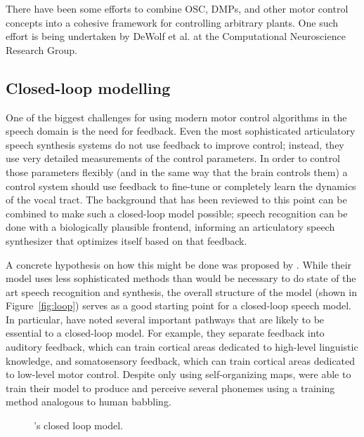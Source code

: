 \documentclass{article}
\begin{document}
There have been some efforts
to combine OSC, DMPs, and other motor control concepts
into a cohesive framework
for controlling arbitrary plants.
One such effort is being undertaken
by DeWolf et al. at the
Computational Neuroscience Research Group.

\subsection{Closed-loop modelling}
\label{subsec:closed-loop}

One of the biggest challenges
for using modern motor control algorithms
in the speech domain
is the need for feedback.
Even the most sophisticated
articulatory speech synthesis systems
do not use feedback to improve control;
instead, they use very detailed measurements
of the control parameters.
In order to control those parameters flexibly
(and in the same way that the brain controls them)
a control system should use feedback
to fine-tune or completely learn
the dynamics of the vocal tract.
The background that has been reviewed
to this point can be combined
to make such a closed-loop model possible;
speech recognition can be done
with a biologically plausible frontend,
informing an articulatory speech synthesizer
that optimizes itself based on that feedback.

A concrete hypothesis on how
this might be done was proposed by
\citet{kroger2009}.
While their model uses less sophisticated
methods than would be necessary
to do state of the art
speech recognition and synthesis,
the overall structure of the model
(shown in Figure~\ref{fig:loop})
serves as a good starting point
for a closed-loop speech model.
In particular, \citeauthor{kroger2009} have
noted several important pathways
that are likely to be essential
to a closed-loop model.
For example, they separate feedback
into auditory feedback,
which can train cortical areas
dedicated to high-level linguistic knowledge,
and somatosensory feedback,
which can train cortical areas
dedicated to low-level motor control.
Despite only using self-organizing maps,
\citeauthor{kroger2009} were able to train their model
to produce and perceive several phonemes
using a training method analogous
to human babbling.

\begin{figure}
  \begin{center}
  \end{center}
  \caption{\citeauthor{kroger2009}'s closed loop model.}
  \label{fig:kroeger}
\end{figure}
\end{document}

